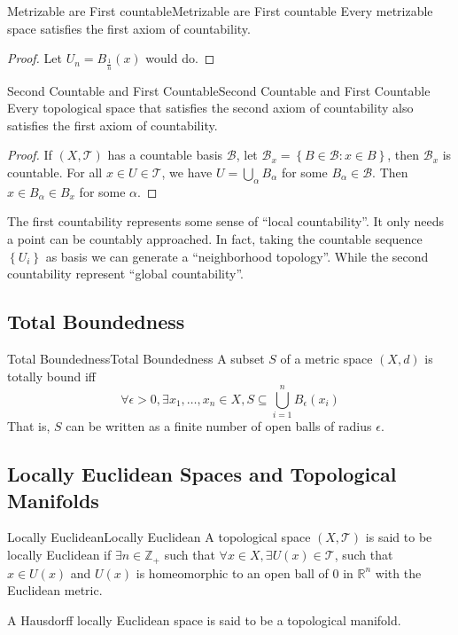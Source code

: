 \documentclass[../main.tex]{subfiles}
\begin{document}
\begin{theorem}{Metrizable are First countable}{Metrizable are First countable}
Every metrizable space satisfies the first axiom of countability.
\end{theorem}
\begin{proof}
Let $U_n = B_{\frac{1}{n}}(x)$ would do.
\end{proof}

\begin{theorem}{Second Countable and First Countable}{Second Countable and First Countable}
Every topological space that satisfies the second axiom of countability also satisfies the first axiom of countability.
\end{theorem}
\begin{proof}
If $(X,\mathcal{T})$ has a countable basis $\mathcal{B}$, let $\mathcal{B}_x = \left\{ B\in \mathcal{B}: x\in B \right\}$, then $\mathcal{B}_x$ is countable. For all $x\in U \in \mathcal{T}$, we have $U = \bigcup_{\alpha} B_{\alpha} $ for some $B_{\alpha}\in \mathcal{B}$. Then $x\in B_{\alpha}\in B_x$ for some $\alpha$.
\end{proof}

\begin{remark}
The first countability represents some sense of ``local countability''. It only needs a point can be countably approached. In fact, taking the countable sequence $\left\{ U_i \right\}$ as basis we can generate a ``neighborhood topology''. While the second countability represent ``global countability''.
\end{remark}

\subsection{Total Boundedness}
\begin{definition}{Total Boundedness}{Total Boundedness}
A subset $S$ of a metric space $(X,d)$ is totally bound iff
\begin{equation*}
\forall \epsilon>0, \exists x_1, \ldots ,x_n\in X, S \subseteq \bigcup_{i=1}^n B_{\epsilon}(x_i)
\end{equation*}
That is, $S$ can be written as a finite number of open balls of radius $\epsilon$.
\end{definition}


\subsection{Locally Euclidean Spaces and Topological Manifolds}
\begin{definition}{Locally Euclidean}{Locally Euclidean}
A topological space $(X,\mathcal{T})$ is said to be locally Euclidean if $\exists n\in \mathbb{Z}_+$ such that $\forall x\in X, \exists U(x) \in \mathcal{T}$, such that $x\in U(x)$ and $U(x)$ is homeomorphic to an open ball of $0$ in $\mathbb{R}^n$ with the Euclidean metric.

A Hausdorff locally Euclidean space is said to be a topological manifold.
\end{definition}
\end{document}
